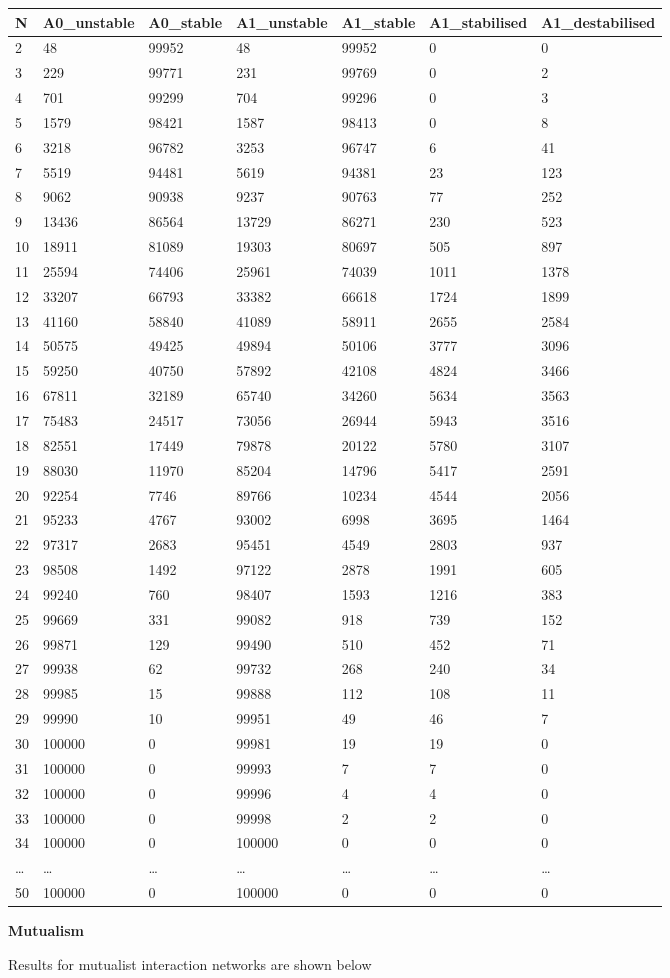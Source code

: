 \documentclass[]{article}
\begin{document}
\begin{longtable}[]{@{}lllllll@{}}
\toprule
N & A0\_unstable & A0\_stable & A1\_unstable & A1\_stable &
A1\_stabilised & A1\_destabilised\tabularnewline
\midrule
\endhead
2 & 48 & 99952 & 48 & 99952 & 0 & 0\tabularnewline
3 & 229 & 99771 & 231 & 99769 & 0 & 2\tabularnewline
4 & 701 & 99299 & 704 & 99296 & 0 & 3\tabularnewline
5 & 1579 & 98421 & 1587 & 98413 & 0 & 8\tabularnewline
6 & 3218 & 96782 & 3253 & 96747 & 6 & 41\tabularnewline
7 & 5519 & 94481 & 5619 & 94381 & 23 & 123\tabularnewline
8 & 9062 & 90938 & 9237 & 90763 & 77 & 252\tabularnewline
9 & 13436 & 86564 & 13729 & 86271 & 230 & 523\tabularnewline
10 & 18911 & 81089 & 19303 & 80697 & 505 & 897\tabularnewline
11 & 25594 & 74406 & 25961 & 74039 & 1011 & 1378\tabularnewline
12 & 33207 & 66793 & 33382 & 66618 & 1724 & 1899\tabularnewline
13 & 41160 & 58840 & 41089 & 58911 & 2655 & 2584\tabularnewline
14 & 50575 & 49425 & 49894 & 50106 & 3777 & 3096\tabularnewline
15 & 59250 & 40750 & 57892 & 42108 & 4824 & 3466\tabularnewline
16 & 67811 & 32189 & 65740 & 34260 & 5634 & 3563\tabularnewline
17 & 75483 & 24517 & 73056 & 26944 & 5943 & 3516\tabularnewline
18 & 82551 & 17449 & 79878 & 20122 & 5780 & 3107\tabularnewline
19 & 88030 & 11970 & 85204 & 14796 & 5417 & 2591\tabularnewline
20 & 92254 & 7746 & 89766 & 10234 & 4544 & 2056\tabularnewline
21 & 95233 & 4767 & 93002 & 6998 & 3695 & 1464\tabularnewline
22 & 97317 & 2683 & 95451 & 4549 & 2803 & 937\tabularnewline
23 & 98508 & 1492 & 97122 & 2878 & 1991 & 605\tabularnewline
24 & 99240 & 760 & 98407 & 1593 & 1216 & 383\tabularnewline
25 & 99669 & 331 & 99082 & 918 & 739 & 152\tabularnewline
26 & 99871 & 129 & 99490 & 510 & 452 & 71\tabularnewline
27 & 99938 & 62 & 99732 & 268 & 240 & 34\tabularnewline
28 & 99985 & 15 & 99888 & 112 & 108 & 11\tabularnewline
29 & 99990 & 10 & 99951 & 49 & 46 & 7\tabularnewline
30 & 100000 & 0 & 99981 & 19 & 19 & 0\tabularnewline
31 & 100000 & 0 & 99993 & 7 & 7 & 0\tabularnewline
32 & 100000 & 0 & 99996 & 4 & 4 & 0\tabularnewline
33 & 100000 & 0 & 99998 & 2 & 2 & 0\tabularnewline
34 & 100000 & 0 & 100000 & 0 & 0 & 0\tabularnewline
\ldots{} & \ldots{} & \ldots{} & \ldots{} & \ldots{} & \ldots{} &
\ldots{}\tabularnewline
50 & 100000 & 0 & 100000 & 0 & 0 & 0\tabularnewline
\bottomrule
\end{longtable}

\textbf{Mutualism}

Results for mutualist interaction networks are shown below
\end{document}
